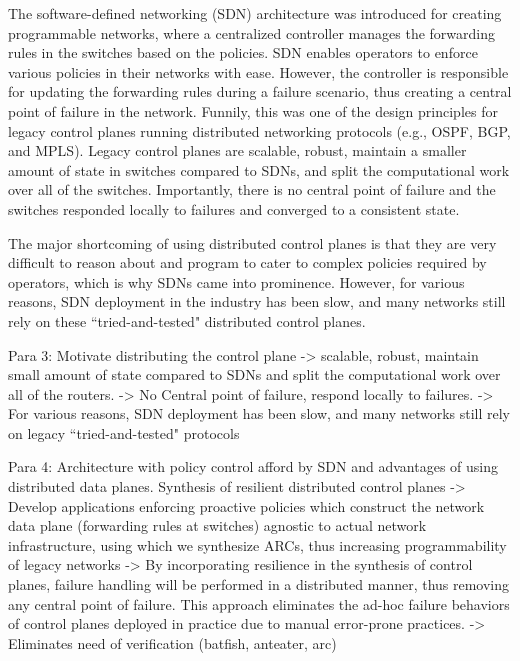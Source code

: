 \documentclass{hotnets16}
\begin{document}
The software-defined networking (SDN) architecture was introduced
for creating programmable networks, where a centralized controller
manages the forwarding rules in the switches based on the policies.
SDN enables operators to enforce various policies in their networks 
with ease. 
However, the controller is responsible for updating the forwarding
rules during a failure scenario, thus creating a central point of 
failure in the network. Funnily, this was one of the design principles
for legacy control planes running distributed networking protocols 
(e.g., OSPF, BGP, and MPLS). 
Legacy control planes are scalable, robust, maintain a smaller amount 
of state in switches compared to SDNs, 
and split the computational work over all of the switches. 
Importantly, there is no central point of failure and the switches
responded locally to failures and converged to a consistent state. 

The major shortcoming of using distributed control planes is that
they are very difficult to reason about and program to cater to 
complex policies required by operators, which is why SDNs came into
prominence. However, for various reasons, 
SDN deployment in the industry has been slow, and many 
networks still rely on these ``tried-and-tested" distributed 
control planes. 

Para 3: Motivate distributing the control plane
->  scalable, robust, maintain small amount of state compared to SDNs
	and split the computational work over all of the routers. 
->  No Central point of failure, respond locally to failures.
->  For various reasons, SDN deployment has been slow, and many 
	networks still rely on legacy ``tried-and-tested" protocols 

Para 4: Architecture with policy control afford by SDN and advantages of using
distributed data planes. Synthesis of resilient distributed control planes
->  Develop applications enforcing proactive policies
	which construct the network data plane (forwarding rules at switches)
	agnostic to actual network infrastructure, using which we synthesize
	ARCs, thus increasing programmability of 
	legacy networks
->  By incorporating resilience in the synthesis of 
	control planes, failure handling will be 
	performed in a distributed manner, thus removing any central point 
	of failure. This approach eliminates the ad-hoc failure behaviors of
	control planes deployed in practice due to manual error-prone practices. 
->  Eliminates need of verification (batfish, anteater, arc)
\end{document}
